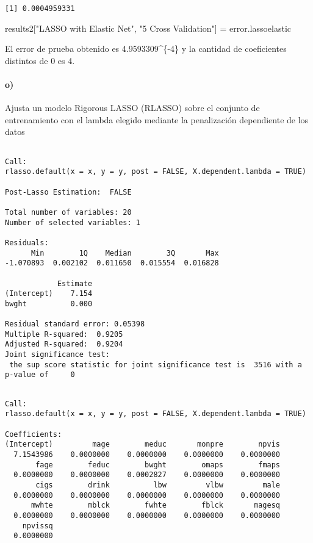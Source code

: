 \documentclass[]{article}
\newenvironment{Shaded}{\begin{snugshade}}{\end{snugshade}}
\newcommand{\StringTok}[1]{\textcolor[rgb]{0.31,0.60,0.02}{#1}}
\newcommand{\NormalTok}[1]{#1}
\let\oldparagraph\paragraph
\renewcommand{\paragraph}[1]{\oldparagraph{#1}\mbox{}}
\begin{document}
\begin{verbatim}
[1] 0.0004959331
\end{verbatim}

\begin{Shaded}
\begin{Highlighting}[]
\NormalTok{results2[}\StringTok{"LASSO with Elastic Net"}\NormalTok{, }\StringTok{"5 Cross Validation"}\NormalTok{] =}\StringTok{ }\NormalTok{error.lassoelastic}
\end{Highlighting}
\end{Shaded}

El error de prueba obtenido es 4.9593309\^{}\{-4\} y la
cantidad de coeficientes distintos de 0 es 4.

\paragraph{o)}\label{o}

Ajusta un modelo Rigorous LASSO (RLASSO) sobre el conjunto de
entrenamiento con el lambda elegido mediante la penalización dependiente
de los datos

\begin{verbatim}

Call:
rlasso.default(x = x, y = y, post = FALSE, X.dependent.lambda = TRUE)

Post-Lasso Estimation:  FALSE 

Total number of variables: 20
Number of selected variables: 1 

Residuals: 
      Min        1Q    Median        3Q       Max 
-1.070893  0.002102  0.011650  0.015554  0.016828 

            Estimate
(Intercept)    7.154
bwght          0.000

Residual standard error: 0.05398
Multiple R-squared:  0.9205
Adjusted R-squared:  0.9204
Joint significance test:
 the sup score statistic for joint significance test is  3516 with a p-value of     0
\end{verbatim}

\begin{verbatim}

Call:
rlasso.default(x = x, y = y, post = FALSE, X.dependent.lambda = TRUE)

Coefficients:
(Intercept)         mage        meduc       monpre        npvis  
  7.1543986    0.0000000    0.0000000    0.0000000    0.0000000  
       fage        feduc        bwght        omaps        fmaps  
  0.0000000    0.0000000    0.0002827    0.0000000    0.0000000  
       cigs        drink          lbw         vlbw         male  
  0.0000000    0.0000000    0.0000000    0.0000000    0.0000000  
      mwhte        mblck        fwhte        fblck       magesq  
  0.0000000    0.0000000    0.0000000    0.0000000    0.0000000  
    npvissq  
  0.0000000  
\end{verbatim}
\end{document}

